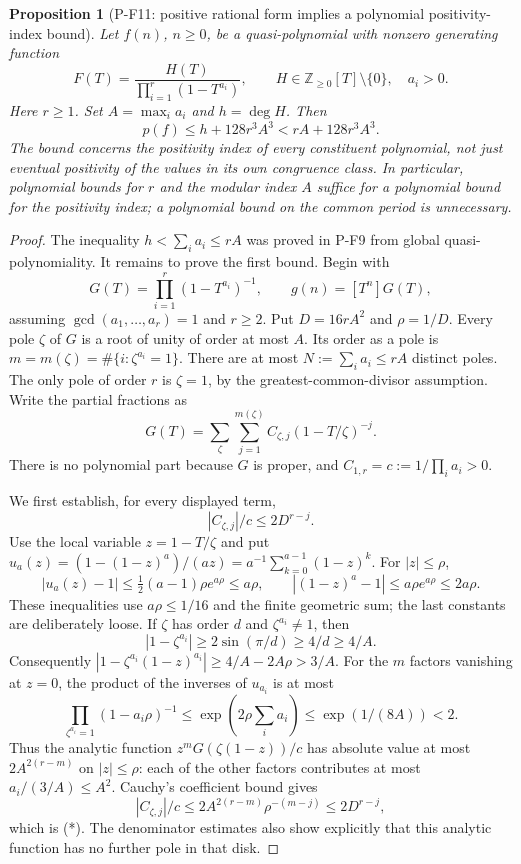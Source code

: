 \documentclass[11pt,a4paper]{article}
\newtheorem{proposition}{Proposition}[section]
\begin{document}
\begin{proposition}[P-F11: positive rational form implies a polynomial positivity-index bound]
\label{prop:modularbound}
Let $f(n)$, $n\ge0$, be a quasi-polynomial with nonzero generating function
\[
 F(T)=\frac{H(T)}{\prod_{i=1}^r(1-T^{a_i})},\qquad
 H\in\mathbb Z_{\ge0}[T]\setminus\{0\},\quad a_i>0.
\]
Here $r\ge1$. Set $A=\max_i a_i$ and $h=\deg H$. Then
\[
 p(f)\le h+128r^3A^3 < rA+128r^3A^3.
 \tag{P-F11}
\]
The bound concerns the positivity index of every constituent polynomial,
not just eventual positivity of the values in its own congruence class.
In particular, polynomial bounds for $r$ and the modular index $A$
suffice for a polynomial bound for the positivity index; a polynomial
bound on the common period is unnecessary.
\end{proposition}
\begin{proof}
The inequality $h<\sum_i a_i\le rA$ was proved in P-F9 from global
quasi-polynomiality. It remains to prove the first bound. Begin with
\[
 G(T)=\prod_{i=1}^r(1-T^{a_i})^{-1},\qquad g(n)=[T^n]G(T),
\]
assuming $\gcd(a_1,\ldots,a_r)=1$ and $r\ge2$. Put
$D=16rA^2$ and $\rho=1/D$. Every pole $\zeta$ of $G$ is a root of unity
of order at most $A$. Its order as a pole is
$m=m(\zeta)=\#\{i:\zeta^{a_i}=1\}$.
There are at most $N:=\sum_i a_i\le rA$ distinct poles. The only pole
of order $r$ is $\zeta=1$, by the greatest-common-divisor assumption.
Write the partial fractions as
\[
 G(T)=\sum_{\zeta}\sum_{j=1}^{m(\zeta)}
 C_{\zeta,j}(1-T/\zeta)^{-j}.
\]
There is no polynomial part because $G$ is proper, and
$C_{1,r}=c:=1/\prod_i a_i>0$.

We first establish, for every displayed term,
\[
 |C_{\zeta,j}|/c\le 2D^{r-j}.                 \tag{*}
\]
Use the local variable $z=1-T/\zeta$ and put
$u_a(z)=(1-(1-z)^a)/(az)=a^{-1}\sum_{k=0}^{a-1}(1-z)^k$.
For $|z|\le\rho$,
\[
 |u_a(z)-1|\le\tfrac12(a-1)\rho e^{a\rho}\le a\rho,
 \qquad
 |(1-z)^a-1|\le a\rho e^{a\rho}\le2a\rho.
\]
These inequalities use $a\rho\le1/16$ and the finite geometric sum;
the last constants are deliberately loose. If $\zeta$ has order $d$
and $\zeta^{a_i}\ne1$, then
\[
 |1-\zeta^{a_i}|\ge2\sin(\pi/d)\ge4/d\ge4/A.
\]
Consequently
$|1-\zeta^{a_i}(1-z)^{a_i}|\ge4/A-2A\rho>3/A$.
For the $m$ factors vanishing at $z=0$, the product of the inverses of
$u_{a_i}$ is at most
\[
 \prod_{\zeta^{a_i}=1}(1-a_i\rho)^{-1}
 \le\exp(2\rho\textstyle\sum_i a_i)
 \le\exp(1/(8A))<2.
\]
Thus the analytic function $z^mG(\zeta(1-z))/c$ has absolute value at
most $2A^{2(r-m)}$ on $|z|\le\rho$: each of the other factors contributes
at most $a_i/(3/A)\le A^2$.
Cauchy's coefficient bound gives
\[
 |C_{\zeta,j}|/c
 \le2A^{2(r-m)}\rho^{-(m-j)}
 \le2D^{r-j},
\]
which is (*). The denominator estimates also show explicitly that this
analytic function has no further pole in that disk.


\end{proof}
\end{document}
